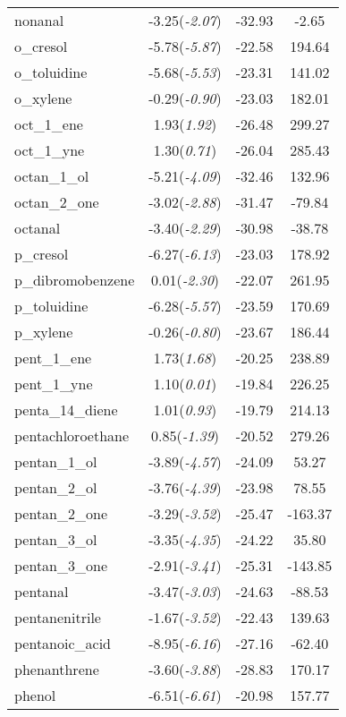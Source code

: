 \documentclass{amsart}
\begin{document}
\begin{center}
\begin{longtable}{l|c|c|c}
nonanal & -3.25(\textit{-2.07}) & -32.93 & -2.65 \\ 
o\_cresol & -5.78(\textit{-5.87}) & -22.58 & 194.64 \\ 
o\_toluidine & -5.68(\textit{-5.53}) & -23.31 & 141.02 \\ 
o\_xylene & -0.29(\textit{-0.90}) & -23.03 & 182.01 \\ 
oct\_1\_ene & 1.93(\textit{1.92}) & -26.48 & 299.27 \\ 
oct\_1\_yne & 1.30(\textit{0.71}) & -26.04 & 285.43 \\ 
octan\_1\_ol & -5.21(\textit{-4.09}) & -32.46 & 132.96 \\ 
octan\_2\_one & -3.02(\textit{-2.88}) & -31.47 & -79.84 \\ 
octanal & -3.40(\textit{-2.29}) & -30.98 & -38.78 \\ 
p\_cresol & -6.27(\textit{-6.13}) & -23.03 & 178.92 \\ 
p\_dibromobenzene & 0.01(\textit{-2.30}) & -22.07 & 261.95 \\ 
p\_toluidine & -6.28(\textit{-5.57}) & -23.59 & 170.69 \\ 
p\_xylene & -0.26(\textit{-0.80}) & -23.67 & 186.44 \\ 
pent\_1\_ene & 1.73(\textit{1.68}) & -20.25 & 238.89 \\ 
pent\_1\_yne & 1.10(\textit{0.01}) & -19.84 & 226.25 \\ 
penta\_14\_diene & 1.01(\textit{0.93}) & -19.79 & 214.13 \\ 
pentachloroethane & 0.85(\textit{-1.39}) & -20.52 & 279.26 \\ 
pentan\_1\_ol & -3.89(\textit{-4.57}) & -24.09 & 53.27 \\ 
pentan\_2\_ol & -3.76(\textit{-4.39}) & -23.98 & 78.55 \\ 
pentan\_2\_one & -3.29(\textit{-3.52}) & -25.47 & -163.37 \\ 
pentan\_3\_ol & -3.35(\textit{-4.35}) & -24.22 & 35.80 \\ 
pentan\_3\_one & -2.91(\textit{-3.41}) & -25.31 & -143.85 \\ 
pentanal & -3.47(\textit{-3.03}) & -24.63 & -88.53 \\ 
pentanenitrile & -1.67(\textit{-3.52}) & -22.43 & 139.63 \\ 
pentanoic\_acid & -8.95(\textit{-6.16}) & -27.16 & -62.40 \\ 
phenanthrene & -3.60(\textit{-3.88}) & -28.83 & 170.17 \\ 
phenol & -6.51(\textit{-6.61}) & -20.98 & 157.77 \\ 

\end{longtable}
\end{center}
\end{document}
